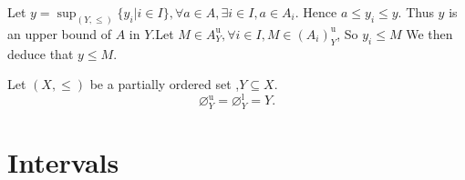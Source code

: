\documentclass{book}
\numberwithin{equation}{section}
\begin{document}
\begin{proofenv}
    Let $y=\sup_{(Y,\le)}\{y_i|i\in I\},\forall a\in A ,\exists i\in I,a\in A_i$. Hence $a\le y_i\le y$. Thus $y $ is an upper bound of $A$ in $Y$.Let $M\in A_Y^\mathrm{u},\forall i \in I,M\in (A_i)_Y^\mathrm{u}$, So $y_i \le M $ We then deduce that $y\le M$.
\end{proofenv}
\begin{propositionenv}
    Let $(X,\le)$ be a partially ordered set ,$Y\subseteq X$.$$\varnothing_Y^\mathrm{u}=\varnothing_Y^\mathrm{l}=Y.$$
\end{propositionenv}


\section{Intervals}
\end{document}
